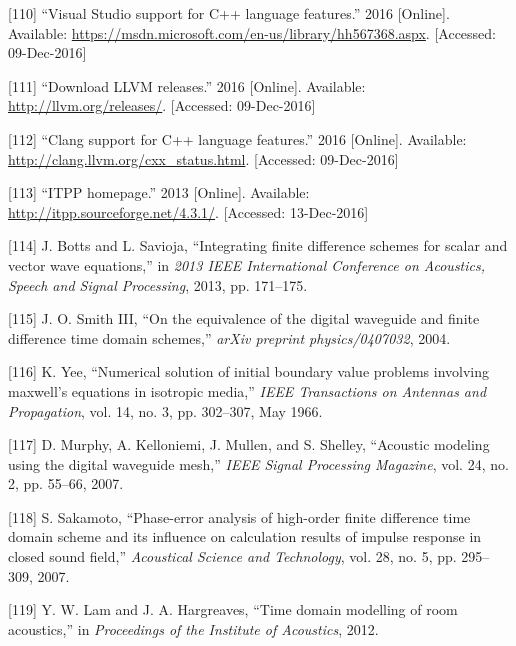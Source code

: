 \documentclass[]{scrreprt}
\begin{document}
\hypertarget{ref-ux5fvisualux5f2016}{}
{[}110{]} ``Visual Studio support for C++ language features.'' 2016
{[}Online{]}. Available:
\url{https://msdn.microsoft.com/en-us/library/hh567368.aspx}.
{[}Accessed: 09-Dec-2016{]}

\hypertarget{ref-ux5fdownloadux5f2016}{}
{[}111{]} ``Download LLVM releases.'' 2016 {[}Online{]}. Available:
\url{http://llvm.org/releases/}. {[}Accessed: 09-Dec-2016{]}

\hypertarget{ref-ux5fclangux5f2016}{}
{[}112{]} ``Clang support for C++ language features.'' 2016
{[}Online{]}. Available: \url{http://clang.llvm.org/cxx_status.html}.
{[}Accessed: 09-Dec-2016{]}

\hypertarget{ref-ux5fitppux5f2013}{}
{[}113{]} ``ITPP homepage.'' 2013 {[}Online{]}. Available:
\url{http://itpp.sourceforge.net/4.3.1/}. {[}Accessed: 13-Dec-2016{]}

\hypertarget{ref-bottsux5fintegratingux5f2013}{}
{[}114{]} J. Botts and L. Savioja, ``Integrating finite difference
schemes for scalar and vector wave equations,'' in \emph{2013 IEEE
International Conference on Acoustics, Speech and Signal Processing},
2013, pp. 171--175.

\hypertarget{ref-smithux5fiiiux5fequivalenceux5f2004}{}
{[}115{]} J. O. Smith III, ``On the equivalence of the digital waveguide
and finite difference time domain schemes,'' \emph{arXiv preprint
physics/0407032}, 2004.

\hypertarget{ref-yeeux5fnumericalux5f1966}{}
{[}116{]} K. Yee, ``Numerical solution of initial boundary value
problems involving maxwell's equations in isotropic media,'' \emph{IEEE
Transactions on Antennas and Propagation}, vol. 14, no. 3, pp. 302--307,
May 1966.

\hypertarget{ref-murphyux5facousticux5f2007}{}
{[}117{]} D. Murphy, A. Kelloniemi, J. Mullen, and S. Shelley,
``Acoustic modeling using the digital waveguide mesh,'' \emph{IEEE
Signal Processing Magazine}, vol. 24, no. 2, pp. 55--66, 2007.

\hypertarget{ref-sakamotoux5fphase-errorux5f2007}{}
{[}118{]} S. Sakamoto, ``Phase-error analysis of high-order finite
difference time domain scheme and its influence on calculation results
of impulse response in closed sound field,'' \emph{Acoustical Science
and Technology}, vol. 28, no. 5, pp. 295--309, 2007.

\hypertarget{ref-lamux5ftimeux5f2012}{}
{[}119{]} Y. W. Lam and J. A. Hargreaves, ``Time domain modelling of
room acoustics,'' in \emph{Proceedings of the Institute of Acoustics},
2012.
\end{document}
